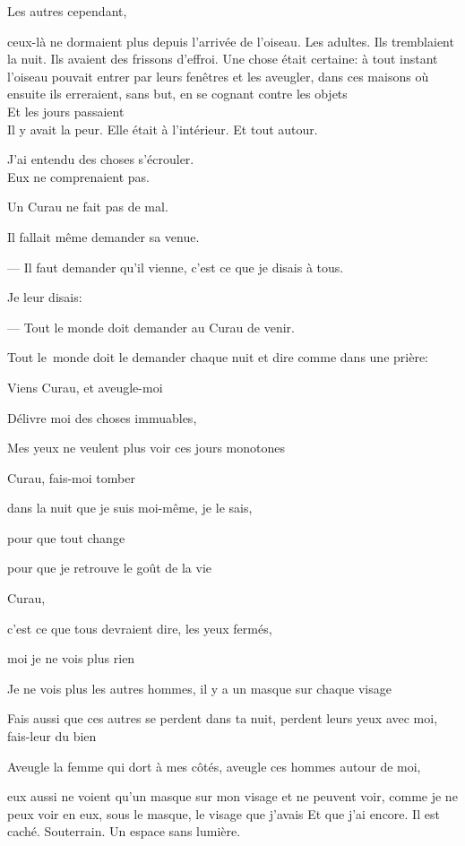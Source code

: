 Les autres cependant,

ceux-là ne dormaient plus depuis l'arrivée de l'oiseau. Les adultes. Ils
tremblaient la nuit. Ils avaient des frissons d'effroi. Une chose était
certaine: à tout instant l'oiseau pouvait entrer par leurs fenêtres et
les aveugler, dans ces maisons où ensuite ils erreraient, sans but, en
se cognant contre les objets\\

Et les jours passaient\\

Il y avait la peur. Elle était à l'intérieur. Et tout autour.

J'ai entendu des choses s'écrouler.\\

Eux ne comprenaient pas.

Un Curau ne fait pas de mal.

Il fallait même demander sa venue.

--- Il faut demander qu'il vienne, c'est ce que je disais à tous.

Je leur disais:

--- Tout le monde doit demander au Curau de venir.

Tout le~monde doit le demander chaque nuit et dire comme dans une
prière:

Viens Curau, et aveugle-moi

Délivre moi des choses immuables,

Mes yeux ne veulent plus voir ces jours monotones

Curau, fais-moi tomber

dans la nuit que je suis moi-même, je le sais,

pour que tout change

pour que je retrouve le goût de la vie

Curau,

c'est ce que tous devraient dire, les yeux fermés,

moi je ne vois plus rien

Je ne vois plus les autres hommes, il y a un masque sur chaque visage

Fais aussi que ces autres se perdent dans ta nuit, perdent leurs yeux
avec moi, fais-leur du bien

Aveugle la femme qui dort à mes côtés, aveugle ces hommes autour de moi,

eux aussi ne voient qu'un masque sur mon visage et ne peuvent voir,
comme je ne peux voir en eux, sous le masque, le visage que j'avais Et
que j'ai encore. Il est caché. Souterrain. Un espace sans lumière.

